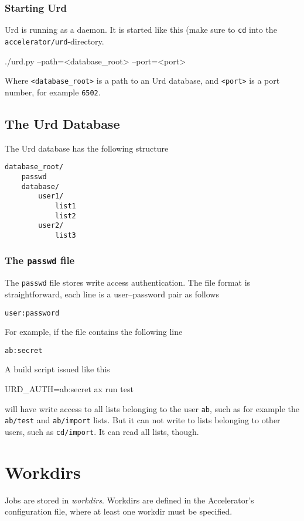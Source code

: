 \subsubsection{Starting Urd}
Urd is running as a daemon.  It is started like this (make sure
to \texttt{cd} into the \texttt{accelerator/urd}-directory.
\begin{shell}
./urd.py --path=<database_root> --port=<port>
\end{shell}
Where \texttt{<database\_root>} is a path to an Urd database,
and \texttt{<port>} is a port number, for example \texttt{6502}.

\subsection{The Urd Database}
The Urd database has the following structure
\begin{verbatim}
database_root/
    passwd
    database/
        user1/
            list1
            list2
        user2/
            list3
\end{verbatim}

\subsubsection{The \texttt{passwd} file}
The \texttt{passwd} file stores write access authentication.  The file
format is straightforward, each line is a user--password pair as follows
\begin{verbatim}
user:password
\end{verbatim}
For example, if the file contains the following line
\begin{verbatim}
ab:secret
\end{verbatim}
A build script issued like this
\begin{shell}
URD_AUTH=ab:secret ax run test
\end{shell}
will have write access to all lists belonging to the user \texttt{ab},
such as for example the \texttt{ab/test} and \texttt{ab/import} lists.
But it can not write to lists belonging to other users, such
as \texttt{cd/import}.  It can read all lists, though.





\section{Workdirs}

Jobs are stored in \textsl{workdirs}.  Workdirs are defined in the
Accelerator's configuration file, where at least one workdir must be
specified.

